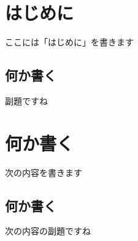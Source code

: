 \documentclass[a4paper, twoside]{jarticle}
\begin{document}
\maketitle %
\begin{multicols}{2} %
\setcounter{page}{1} %

\section{はじめに}
ここには「はじめに」を書きます
\subsection{何か書く}
副題ですね

\section{何か書く}
次の内容を書きます
\subsection{何か書く}
次の内容の副題ですね




\begin{thebibliography}{99}
\end{thebibliography}
\end{multicols} %
\end{document}
